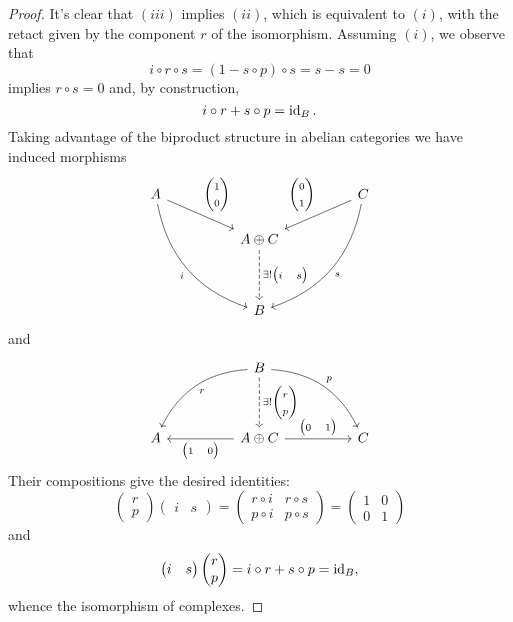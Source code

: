 \documentclass[dissertation.tex]{subfiles}
\begin{document}
\begin{prop}
\begin{proof}
    It's clear that $(iii)$ implies $(ii)$, which is equivalent to $(i)$, with the retact given by the component $r$ of the isomorphism.
    Assuming $(i)$, we observe that
    $$i \circ r \circ s = (1 - s \circ p) \circ s = s - s = 0$$
    implies $r \circ s = 0$ and, by construction,
    $$i \circ r + s \circ p = \operatorname{id}_B.$$
    Taking advantage of the biproduct structure in abelian categories we have induced morphisms
    $$\begin{tikzcd}[ampersand replacement=\&]
      A \arrow[swap,bend right]{rrddd}{i}\arrow{rrd}{\left(\begin{matrix}1\\0\end{matrix}\right)}\&\& \&\& C\arrow[bend left]{llddd}{s}\arrow[swap]{lld}{\left(\begin{matrix}0\\1\end{matrix}\right)}\\
      \& \& A \oplus C\arrow[dashed]{dd}{\exists !\left(\begin{matrix}i & s\end{matrix}\right)}\\
      \\
      \& \& B
    \end{tikzcd}$$
    and
    $$\begin{tikzcd}[ampersand replacement=\&]
      \& \& B \arrow[dashed]{dd}{\exists !\left(\begin{matrix}r\\p\end{matrix}\right)}\arrow[bend right]{lldd}{r}\arrow[bend left]{rrdd}{p}\\
      \\
      A \& \& A \oplus C \arrow{ll}{\left(\begin{matrix}1 & 0\end{matrix}\right)} \arrow{rr}{\left(\begin{matrix}0 & 1\end{matrix}\right)}\&\& C
    \end{tikzcd}$$
    Their compositions give the desired identities:
    $$\left(\begin{matrix}r\\p\end{matrix}\right)\left(\begin{matrix}i & s\end{matrix}\right) = \left(\begin{matrix}r \circ i & r \circ s\\p \circ i & p \circ s\end{matrix}\right) = \left(\begin{matrix}1 & 0\\0 & 1\end{matrix}\right)$$
    and
            $$\left(\begin{matrix}i & s\end{matrix}\right)\left(\begin{matrix}r\\p\end{matrix}\right) = i \circ r + s \circ p = \operatorname{id}_B,$$
   whence the isomorphism of complexes.
  \end{proof}
\end{prop}
\end{document}
